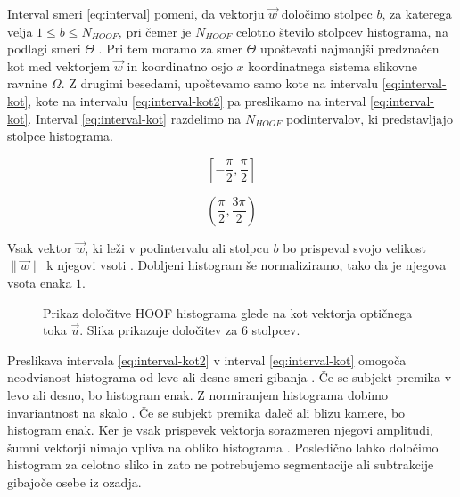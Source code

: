 Interval smeri \eqref{eq:interval} pomeni, da vektorju $\vec{w}$ določimo stolpec $b$, za katerega velja $1 \leq b \leq N_{HOOF}$, pri čemer je $N_{HOOF}$ celotno število stolpcev histograma, na podlagi smeri $\Theta$ \cite{chaudhry2009histograms}. Pri tem moramo za smer $\Theta$ upoštevati najmanjši predznačen kot med vektorjem $\vec{w}$ in koordinatno osjo $x$ koordinatnega sistema slikovne ravnine $\mathit{\Omega}$. Z drugimi besedami, upoštevamo samo kote na intervalu \eqref{eq:interval-kot}, kote na intervalu \eqref{eq:interval-kot2} pa preslikamo na interval \eqref{eq:interval-kot}. Interval \eqref{eq:interval-kot} razdelimo na $N_{HOOF}$ podintervalov, ki predstavljajo stolpce histograma. 

\begin{equation}\label{eq:interval-kot}
	\left[-\frac{\pi}{2}, \frac{\pi}{2}\right]
\end{equation}

\begin{equation}\label{eq:interval-kot2}
	\left(\frac{\pi}{2},\frac{3\pi}{2}\right)
\end{equation}

Vsak vektor $\vec{w}$, ki leži v podintervalu ali stolpcu $b$ bo prispeval svojo velikost $\|\vec{w} \|$ k njegovi vsoti \cite{chaudhry2009histograms}. Dobljeni histogram še normaliziramo, tako da je njegova vsota enaka $1$.





\begin{figure}[htb]
\centering

\caption[Prikaz določitve HOOF histograma glede na kot vektorja]{Prikaz določitve HOOF histograma glede na kot vektorja optičnega toka $\vec{u}$. Slika prikazuje določitev za $6$ stolpcev.}
\label{fig:hoof-histogram}
\end{figure}




Preslikava intervala \eqref{eq:interval-kot2} v interval \eqref{eq:interval-kot} omogoča neodvisnost histograma od leve ali desne smeri gibanja \cite{chaudhry2009histograms}. Če se subjekt premika v levo ali desno, bo histogram enak. Z normiranjem histograma dobimo invariantnost na skalo \cite{chaudhry2009histograms}. Če se subjekt premika daleč ali blizu kamere, bo histogram enak. Ker je vsak prispevek vektorja sorazmeren njegovi amplitudi, šumni vektorji nimajo vpliva na obliko histograma \cite{chaudhry2009histograms}. Posledično lahko določimo histogram za celotno sliko in zato ne potrebujemo segmentacije ali subtrakcije gibajoče osebe iz ozadja. 


